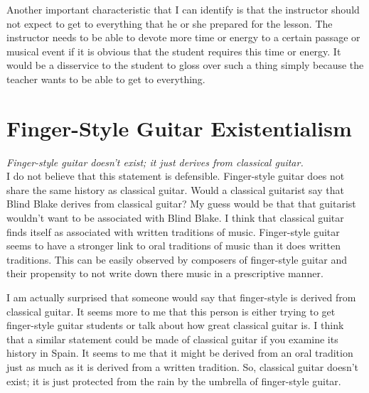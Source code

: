 \documentclass[12pt]{article}
\begin{document}
Another important characteristic that I can identify is that the
instructor should not expect to get to everything that he or she
prepared for the lesson. The instructor needs to be able to devote
more time or energy to a certain passage or musical event if it is
obvious that the student requires this time or energy. It would be a
disservice to the student to gloss over such a thing simply because
the teacher wants to be able to get to everything.

\section{Finger-Style Guitar Existentialism}
\label{sec:finger-style-guitar}

\emph{Finger-style guitar doesn't exist; it just derives from classical guitar.}\\

\noindent I do not believe that this statement is
defensible. Finger-style guitar does not share the same history as
classical guitar. Would a classical guitarist say that Blind Blake
derives from classical guitar? My guess would be that that guitarist
wouldn't want to be associated with Blind Blake. I think that
classical guitar finds itself as associated with written traditions of
music. Finger-style guitar seems to have a stronger link to oral
traditions of music than it does written traditions. This can be
easily observed by composers of finger-style guitar and their
propensity to not write down there music in a prescriptive manner.

I am actually surprised that someone would say that finger-style is
derived from classical guitar. It seems more to me that this person is
either trying to get finger-style guitar students or talk about how
great classical guitar is. I think that a similar statement could be
made of classical guitar if you examine its history in Spain. It seems
to me that it might be derived from an oral tradition just as much as
it is derived from a written tradition. So, classical guitar doesn't
exist; it is just protected from the rain by the umbrella of
finger-style guitar.
\end{document}

